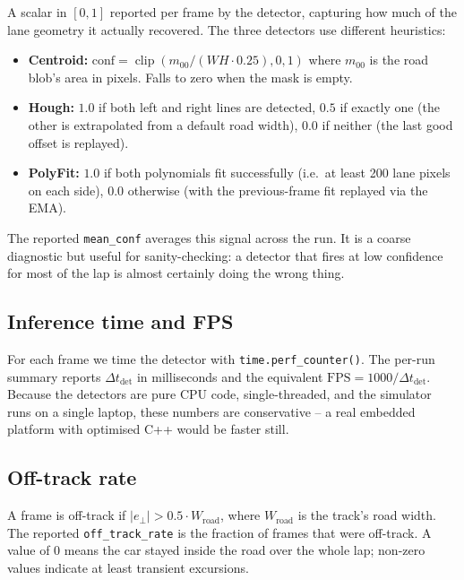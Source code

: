 A scalar in $[0,1]$ reported per frame by the detector, capturing how
much of the lane geometry it actually recovered. The three detectors
use different heuristics:
\begin{itemize}[leftmargin=1.4em,itemsep=2pt]
  \item \textbf{Centroid:}
        $\text{conf} = \operatorname{clip}(m_{00}/(W H\cdot 0.25),0,1)$
        where $m_{00}$ is the road blob's area in pixels. Falls to
        zero when the mask is empty.
  \item \textbf{Hough:} $1.0$ if both left and right lines are
        detected, $0.5$ if exactly one (the other is extrapolated from
        a default road width), $0.0$ if neither (the last good offset
        is replayed).
  \item \textbf{PolyFit:} $1.0$ if both polynomials fit successfully
        (i.e.\ at least 200 lane pixels on each side), $0.0$ otherwise
        (with the previous-frame fit replayed via the EMA).
\end{itemize}
The reported \texttt{mean\_conf} averages this signal across the run.
It is a coarse diagnostic but useful for sanity-checking: a detector
that fires at low confidence for most of the lap is almost certainly
doing the wrong thing.

\subsection{Inference time and FPS}

For each frame we time the detector with \texttt{time.perf\_counter()}.
The per-run summary reports $\Delta t_{\text{det}}$ in milliseconds
and the equivalent $\text{FPS} = 1000/\Delta t_{\text{det}}$. Because
the detectors are pure CPU code, single-threaded, and the simulator
runs on a single laptop, these numbers are conservative -- a real
embedded platform with optimised C++ would be faster still.

\subsection{Off-track rate}

A frame is off-track if $|e_\perp|>0.5\cdot W_{\text{road}}$, where
$W_{\text{road}}$ is the track's road width. The reported
\texttt{off\_track\_rate} is the fraction of frames that were
off-track. A value of $0$ means the car stayed inside the road over
the whole lap; non-zero values indicate at least transient excursions.


